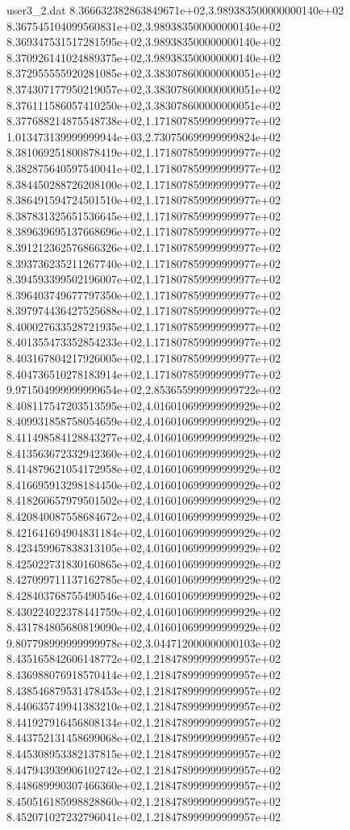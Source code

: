 \begin{filecontents}{user3_2.dat}
8.366632382863849671e+02,3.989383500000000140e+02
8.367545104099560831e+02,3.989383500000000140e+02
8.369347531517281595e+02,3.989383500000000140e+02
8.370926141024889375e+02,3.989383500000000140e+02
8.372955555920281085e+02,3.383078600000000051e+02
8.374307177950219057e+02,3.383078600000000051e+02
8.376111586057410250e+02,3.383078600000000051e+02
8.377688214875548738e+02,1.171807859999999977e+02
1.013473139999999944e+03,2.730750699999999824e+02
8.381069251800878419e+02,1.171807859999999977e+02
8.382875640597540041e+02,1.171807859999999977e+02
8.384450288726208100e+02,1.171807859999999977e+02
8.386491594724501510e+02,1.171807859999999977e+02
8.387831325651536645e+02,1.171807859999999977e+02
8.389639695137668696e+02,1.171807859999999977e+02
8.391212362576866326e+02,1.171807859999999977e+02
8.393736235211267740e+02,1.171807859999999977e+02
8.394593399502196007e+02,1.171807859999999977e+02
8.396403749677797350e+02,1.171807859999999977e+02
8.397974436427525688e+02,1.171807859999999977e+02
8.400027633528721935e+02,1.171807859999999977e+02
8.401355473352854233e+02,1.171807859999999977e+02
8.403167804217926005e+02,1.171807859999999977e+02
8.404736510278183914e+02,1.171807859999999977e+02
9.971504999999999654e+02,2.853655999999999722e+02
8.408117547203513595e+02,4.016010699999999929e+02
8.409931858758054659e+02,4.016010699999999929e+02
8.411498584128843277e+02,4.016010699999999929e+02
8.413563672332942360e+02,4.016010699999999929e+02
8.414879621054172958e+02,4.016010699999999929e+02
8.416695913298184450e+02,4.016010699999999929e+02
8.418260657979501502e+02,4.016010699999999929e+02
8.420840087558684672e+02,4.016010699999999929e+02
8.421641694904831184e+02,4.016010699999999929e+02
8.423459967838313105e+02,4.016010699999999929e+02
8.425022731830160865e+02,4.016010699999999929e+02
8.427099711137162785e+02,4.016010699999999929e+02
8.428403768755490546e+02,4.016010699999999929e+02
8.430224022378441759e+02,4.016010699999999929e+02
8.431784805680819090e+02,4.016010699999999929e+02
9.807798999999999978e+02,3.044712000000000103e+02
8.435165842606148772e+02,1.218478999999999957e+02
8.436988076918570414e+02,1.218478999999999957e+02
8.438546879531478453e+02,1.218478999999999957e+02
8.440635749941383210e+02,1.218478999999999957e+02
8.441927916456808134e+02,1.218478999999999957e+02
8.443752131458699068e+02,1.218478999999999957e+02
8.445308953382137815e+02,1.218478999999999957e+02
8.447943939906102742e+02,1.218478999999999957e+02
8.448689990307466360e+02,1.218478999999999957e+02
8.450516185998828860e+02,1.218478999999999957e+02
8.452071027232796041e+02,1.218478999999999957e+02

\end{filecontents}

